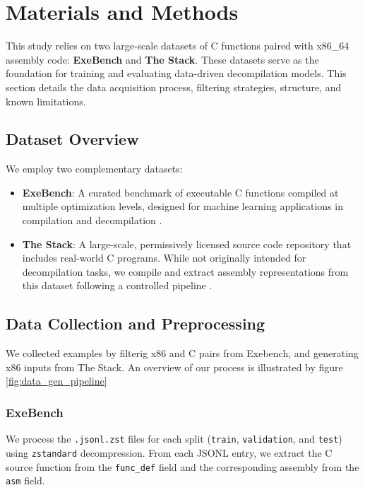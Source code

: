 \documentclass[../main.tex]{subfiles}
\begin{document}
\section{Materials and Methods}

This study relies on two large-scale datasets of C functions paired with x86\_64 assembly code: \textbf{ExeBench} and \textbf{The Stack}. These datasets serve as the foundation for training and evaluating data-driven decompilation models. This section details the data acquisition process, filtering strategies, structure, and known limitations.

\subsection{Dataset Overview}

We employ two complementary datasets:

\begin{itemize}
    \item \textbf{ExeBench}: A curated benchmark of executable C functions compiled at multiple optimization levels, designed for machine learning applications in compilation and decompilation \cite{armengol-estape_exebench_2022}.
    \item \textbf{The Stack}: A large-scale, permissively licensed source code repository that includes real-world C programs. While not originally intended for decompilation tasks, we compile and extract assembly representations from this dataset following a controlled pipeline \cite{kocetkov_stack_2022}.
\end{itemize}

\subsection{Data Collection and Preprocessing}

We collected examples by filterig x86 and C pairs from Exebench, and generating x86 inputs from The Stack. 
An overview of our process is illustrated by figure \ref{fig:data_gen_pipeline}

\subsubsection{ExeBench}

We process the \texttt{.jsonl.zst} files for each split (\texttt{train}, \texttt{validation}, and \texttt{test}) using \texttt{zstandard} decompression. From each JSONL entry, we extract the C source function from the \texttt{func\_def} field and the corresponding assembly from the \texttt{asm} field.
\end{document}
